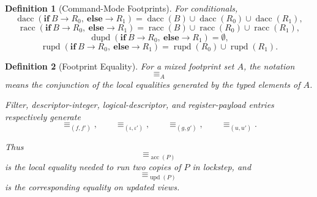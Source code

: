 \documentclass[acmsmall,screen,review,anonymous,nonacm]{acmart}
\newtheorem{definition}{Definition}[section]
\theoremstyle{defn_style}
\begin{document}
\begin{definition}[Command-Mode Footprints]
For conditionals,
\[
\operatorname{dacc}
\left(
\mathbf{if}\ B\rightarrow R_0,\ \mathbf{else}\rightarrow R_1
\right)
=
\operatorname{dacc}(B)
\cup
\operatorname{dacc}(R_0)
\cup
\operatorname{dacc}(R_1),
\]
\[
\operatorname{racc}
\left(
\mathbf{if}\ B\rightarrow R_0,\ \mathbf{else}\rightarrow R_1
\right)
=
\operatorname{racc}(B)
\cup
\operatorname{racc}(R_0)
\cup
\operatorname{racc}(R_1),
\]
\[
\operatorname{dupd}
\left(
\mathbf{if}\ B\rightarrow R_0,\ \mathbf{else}\rightarrow R_1
\right)
=
\emptyset,
\]
\[
\operatorname{rupd}
\left(
\mathbf{if}\ B\rightarrow R_0,\ \mathbf{else}\rightarrow R_1
\right)
=
\operatorname{rupd}(R_0)
\cup
\operatorname{rupd}(R_1).
\]
\end{definition}

\begin{definition}[Footprint Equality]
  For a mixed footprint set \(A\), the notation
  \[
  \equiv_A
  \]
  means the conjunction of the local equalities generated by the typed elements
  of \(A\).
  
  Filter, descriptor-integer, logical-descriptor, and register-payload entries
  respectively generate
  \[
  \equiv_{(f,f')},
  \qquad
  \equiv_{(\iota,\iota')},
  \qquad
  \equiv_{(g,g')},
  \qquad
  \equiv_{(u,u')}.
  \]
  
  Thus
  \[
  \equiv_{\operatorname{acc}(P)}
  \]
  is the local equality needed to run two copies of \(P\) in lockstep, and
  \[
  \equiv_{\operatorname{upd}(P)}
  \]
  is the corresponding equality on updated views.
  \end{definition}
\end{document}
